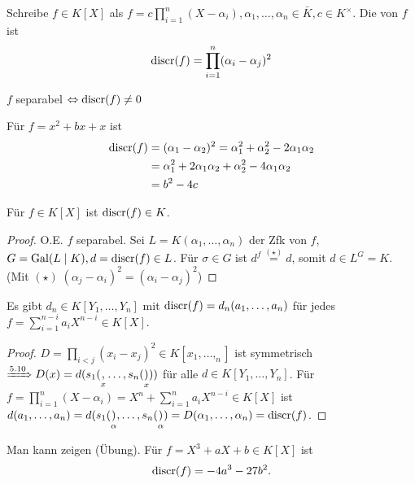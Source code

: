 \begin{definition} %
	Schreibe $f \in K[X]$ als $f = c \prod_{i=1}^n (X-\alpha_i), \alpha_1, \dots,\alpha_n \in \bar{K},c\in K^{\times}$.
	Die  von $f$ ist
	\begin{align*}
		\operatorname{discr}(f) = \prod_{i=1}^n(\alpha_i-\alpha_j)^2
	\end{align*}
\end{definition}
\begin{remark}
	$f$ separabel $\Leftrightarrow \operatorname{discr}(f) \neq 0$
\end{remark}
\begin{example} %
	Für $f=x^2+bx+x$ ist
	\begin{align*}
		\operatorname{discr}(f) &= (\alpha_1-\alpha_2)^2 = \alpha_1^2 + \alpha_2^2-2\alpha_1\alpha_2\\
		&= \alpha_1^2 + 2\alpha_1\alpha_2 + \alpha_2^2 - 4\alpha_1\alpha_2\\
		&= b^2-4c
	\end{align*}
\end{example}
\begin{proposition}
	Für $f \in K[X]$ ist $\operatorname{discr}(f) \in K$.
\end{proposition}
\begin{proof}
	O.E. $f$ separabel. Sei $L=K(\alpha_1,\dots,\alpha_n)$ der Zfk von $f$, $G=\operatorname{Gal}(L\mid K), d=\operatorname{discr}(f)\in L$. Für $\sigma \in G$ ist $d^f \overset{(\star)}{=} d$, somit $d \in L^G = K$. (Mit $(\star)\; (\alpha_j -\alpha_i)^2 = (\alpha_i - \alpha_j)^2$)
\end{proof}
\begin{proposition}
	Es gibt $d_n \in K[Y_1,\dots,Y_n]$ mit $\operatorname{discr}(f) = d_n(a_1,\dots,a_n)$ für jedes $f = \sum_{i=1}^{n-i}a_i X^{n-i} \in K[X]$.
\end{proposition}
\begin{proof}
	$D=\prod_{i< j} (x_i - x_j)^2 \in K[x_1,\dots,_n]$ ist symmetrisch\\
	$\xRightarrow{5.10} D(x) = d(s_1(\underset{x},\dots,s_n(\underset{x})))$ für alle $d \in K[Y_1,\dots,Y_n]$. Für $f =\prod_{i=1}^n(X-\alpha_i) = X^n + \sum_{i=1}^n a_i X^{n-i} \in K[X]$ ist\\
	$d(a_1,\dots,a_n) = d(s_1(\underset{\alpha}),\dots, s_n(\underset{\alpha})) = D(\alpha_1,\dots,\alpha_n) = \operatorname{discr}(f)$. 
\end{proof}
\begin{example}
	Man kann zeigen (Übung). Für $f = X^3+aX+b \in K[X]$ ist
	\begin{align*}
		\operatorname{discr}(f) = -4a^3 -27b^2.
	\end{align*}
\end{example}